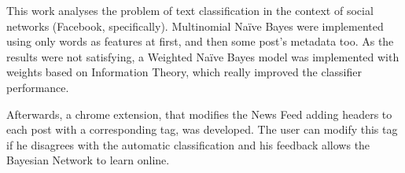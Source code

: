 This work analyses the problem of text classification in the context of social networks (Facebook, specifically). Multinomial Naïve Bayes were implemented using only words as features at first, and then some post's metadata too. As the results were not satisfying, a Weighted Naïve Bayes model was implemented with weights based on Information Theory, which really improved the classifier performance.

Afterwards, a chrome extension, that modifies the News Feed adding headers to each post with a corresponding tag, was developed. The user can modify this tag if he disagrees with the automatic classification and his feedback allows the Bayesian Network to learn online.
